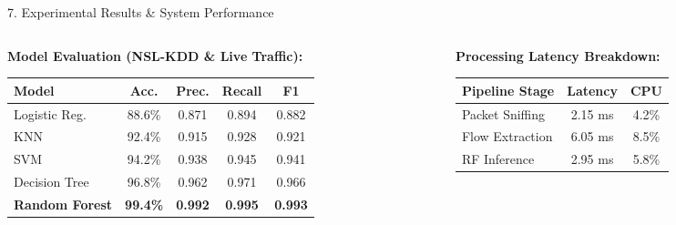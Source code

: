﻿\documentclass[aspectratio=169, 10pt]{beamer}
\begin{document}
\begin{frame}{7. Experimental Results \& System Performance}
    \begin{columns}
        \begin{column}{0.54\textwidth}
            \textbf{Model Evaluation (NSL-KDD \& Live Traffic):}
            \vspace{0.1cm}
            \begin{table}[h]
                \centering
                \scriptsize
                \begin{tabular}{lcccc}
                    \toprule
                    \textbf{Model} & \textbf{Acc.} & \textbf{Prec.} & \textbf{Recall} & \textbf{F1} \\
                    \midrule
                    Logistic Reg. & 88.6\% & 0.871 & 0.894 & 0.882 \\
                    KNN & 92.4\% & 0.915 & 0.928 & 0.921 \\
                    SVM & 94.2\% & 0.938 & 0.945 & 0.941 \\
                    Decision Tree & 96.8\% & 0.962 & 0.971 & 0.966 \\
                    \textbf{Random Forest} & \textbf{99.4\%} & \textbf{0.992} & \textbf{0.995} & \textbf{0.993} \\
                    \bottomrule
                \end{tabular}
            \end{table}
        \end{column}
        \begin{column}{0.46\textwidth}
            \textbf{Processing Latency Breakdown:}
            \vspace{0.1cm}
            \begin{table}[h]
                \centering
                \scriptsize
                \begin{tabular}{lcc}
                    \toprule
                    \textbf{Pipeline Stage} & \textbf{Latency} & \textbf{CPU} \\
                    \midrule
                    Packet Sniffing & 2.15 ms & 4.2\% \\
                    Flow Extraction & 6.05 ms & 8.5\% \\
                    RF Inference & 2.95 ms & 5.8\% \\

\end{tabular}
\end{table}
\end{column}
\end{columns}
\end{frame}
\end{document}
